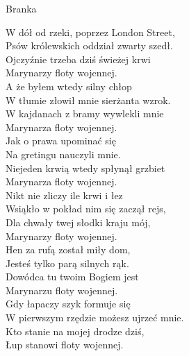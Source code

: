 \begin{piosenka}{Branka}

W dół od rzeki, poprzez London Street, \\
Psów królewskich oddział zwarty szedł. \\
Ojczyźnie trzeba dziś świeżej krwi \\
Marynarzy floty wojennej. \\[\zwrotkaspace]

A że byłem wtedy silny chłop \\
W tłumie złowił mnie sierżanta wzrok. \\ 
W kajdanach z bramy wywlekli mnie \\
Marynarza floty wojennej. \\[\zwrotkaspace]

Jak o prawa upominać się \\
Na gretingu nauczyli mnie. \\
Niejeden krwią wtedy spłynął grzbiet \\ 
Marynarza floty wojennej. \\[\zwrotkaspace]

Nikt nie zliczy ile krwi i łez \\
Wsiąkło w pokład nim się zaczął rejs, \\ 
Dla chwały twej słodki kraju mój, \\
Marynarzy floty wojennej. \\[\zwrotkaspace]

Hen za rufą został miły dom, \\
Jesteś tylko parą silnych rąk. \\
Dowódca tu twoim Bogiem jest \\
Marynarzu floty wojennej. \\[\zwrotkaspace]

Gdy łapaczy szyk formuje się \\
W pierwszym rzędzie możesz ujrzeć mnie. \\ 
Kto stanie na mojej drodze dziś, \\
Łup stanowi floty wojennej. \\[\zwrotkaspace]

\end{piosenka}